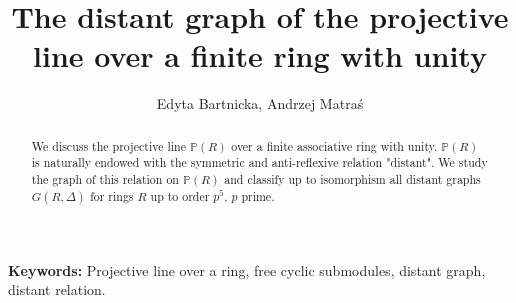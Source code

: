 \documentclass[12pt,a4paper]{article}
\date{}
\theoremstyle{definition}
\begin{document}
\title{\bf  The distant graph of the projective line over a finite ring with unity}
\author{Edyta Bartnicka, Andrzej Matra{\'s}}
\maketitle
\begin{abstract}
\noindent
We discuss the projective line $\mathbb{P}(R)$ over a finite associative ring with unity. $\mathbb{P}(R)$ is naturally endowed with the symmetric and anti-reflexive relation "distant". We study the graph of this relation on $\mathbb{P}(R)$ and classify up to isomorphism all distant graphs $G(R, \Delta)$ for rings $R$ up to order $p^5$, $p$ prime.
\end{abstract}
{\bf Keywords:} Projective line over a ring, free cyclic submodules, distant graph, distant relation.
\end{document}
